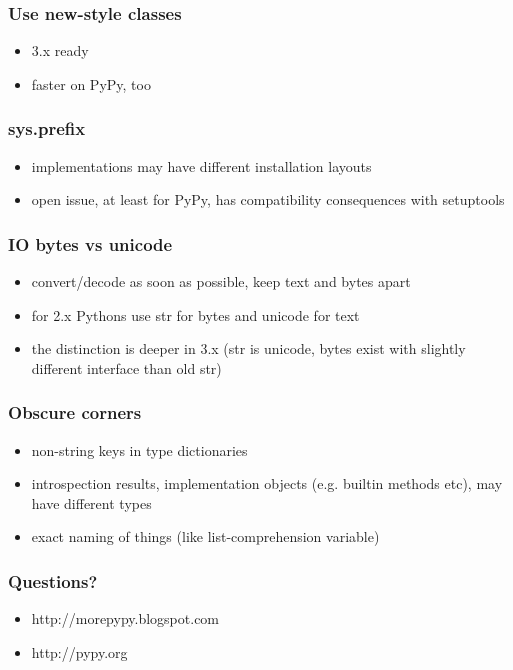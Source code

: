 \documentclass[utf8x, 14pt]{beamer}
\begin{document}
\begin{frame}
  \frametitle{Use new-style classes}
  \begin{itemize}
    \item 3.x ready
    \item faster on PyPy, too
  \end{itemize}
\end{frame}

\begin{frame}
  \frametitle{{\ttfamily sys.prefix}}
  \begin{itemize}
    \item implementations may have different installation layouts
    \item open issue, at least for PyPy, has compatibility consequences with
  setuptools
  \end{itemize}
\end{frame}

\begin{frame}
  \frametitle{IO bytes vs unicode}
  \begin{itemize}
    \item convert/decode as soon as possible, keep text and bytes apart
    \item for 2.x Pythons use str for bytes and unicode for text
    \item the distinction is deeper in 3.x (str is unicode, bytes exist with
  slightly different interface than old str)
  \end{itemize}
\end{frame}

\begin{frame}
  \frametitle{Obscure corners}
  \begin{itemize}
    \item non-string keys in type dictionaries
    \item introspection results, implementation objects (e.g. builtin methods
      etc), may have different types
    \item exact naming of things (like list-comprehension variable)
  \end{itemize}
\end{frame}

\begin{frame}
  \frametitle{Questions?}
  \begin{itemize}
    \item http://morepypy.blogspot.com
    \item http://pypy.org
  \end{itemize}
\end{frame}
\end{document}
